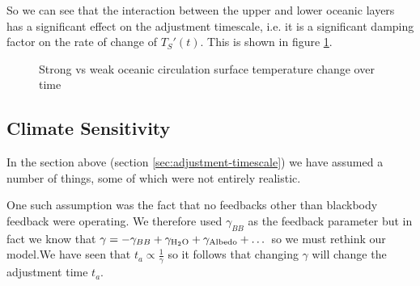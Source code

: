 So we can see that the interaction between the upper and lower oceanic layers
has a significant effect on the adjustment timescale, i.e. it is a significant
damping factor on the rate of change of $T_S'(t)$. This is shown in figure
\ref{fig:surface_temp_timescale}.


\begin{figure}[h!]
    \centering
    \caption{Strong vs weak oceanic circulation surface temperature change over time}
    \label{fig:surface_temp_timescale}
\end{figure}

\subsection{Climate Sensitivity}
\label{sec:climate-sensitivity}

In the section above (section \ref{sec:adjustment-timescale}) we have assumed a
number of things, some of which were not entirely realistic. 

One such assumption was the fact that no feedbacks other than blackbody feedback
were operating. We therefore used $\gamma_{BB}$ as the feedback parameter but in
fact we know that $\gamma = -\gamma_{BB} + \gamma_{\ce{H2O}} + 
\gamma_{\text{Albedo}} + \dots$ so we must rethink our model.We have seen that
$t_a \propto \frac{1}{\gamma}$ so it follows that changing $\gamma$ will change
the adjustment time $t_a$.\\


